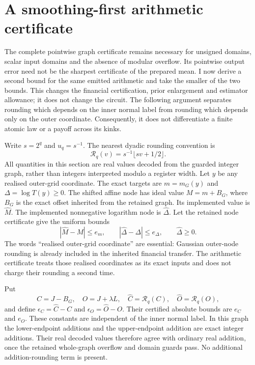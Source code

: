 \section{A smoothing-first arithmetic certificate}
\label{sec:raw-smoothing-first}

The complete pointwise graph certificate remains necessary for unsigned
domains, scalar input domains and the absence of modular overflow. Its
pointwise output error need not be the sharpest certificate of the prepared
mean. I now derive a second bound for the same emitted arithmetic and take
the smaller of the two bounds. This changes the financial certification,
prior enlargement and estimator allowance; it does not change the circuit.
The following argument separates rounding which depends on the inner
normal label from rounding which depends only on the outer coordinate.
Consequently, it does not differentiate a finite atomic law or a payoff
across its kinks.

Write $s=2^q$ and $u_q=s^{-1}$. The nearest dyadic rounding convention is
\[
 \mathcal R_q(v)=s^{-1}\lfloor sv+1/2\rfloor.
\]
All quantities in this section are real values decoded from the guarded
integer graph, rather than integers interpreted modulo a register width.
Let $y$ be any realised outer-grid coordinate. The exact targets are
$m=m_G(y)$ and $\Delta=\log T(y)\geq0$. The shifted affine node has ideal
value $M=m+B_G$, where $B_G$ is the exact offset inherited from the retained
graph. Its implemented value is $\widehat M$. The implemented nonnegative
logarithm node is $\widehat\Delta$. Let the retained node certificate give
the uniform bounds
\[
 |\widehat M-M|\leq e_m,
 \qquad |\widehat\Delta-\Delta|\leq e_\Delta,
 \qquad \widehat\Delta\geq0.
\]
The words ``realised outer-grid coordinate'' are essential: Gaussian
outer-node rounding is already included in the inherited financial
transfer. The arithmetic certificate treats those realised coordinates
as its exact inputs and does not charge their rounding a second time.

Put
\[
 C=J-B_G,\quad O=J+\lambda L,\quad
 \widehat C=\mathcal R_q(C),\quad
 \widehat O=\mathcal R_q(O),
\]
and define $\epsilon_C=\widehat C-C$ and
$\epsilon_O=\widehat O-O$. Their certified absolute bounds are
$e_C$ and $e_O$. These constants are independent of the inner normal
label. In this graph the lower-endpoint additions and the upper-endpoint
addition are exact integer additions. Their real decoded values therefore
agree with ordinary real addition, once the retained whole-graph overflow
and domain guards pass. No additional addition-rounding term is present.

